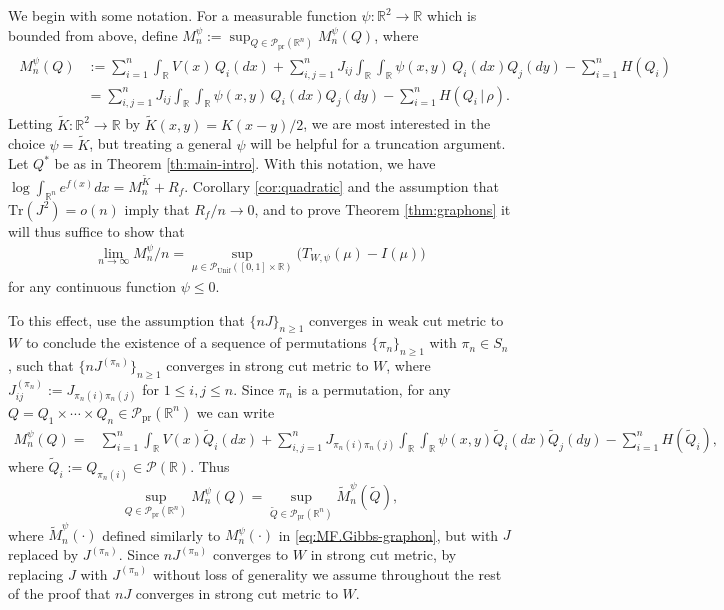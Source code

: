 \documentclass[11pt,reqno]{amsart}
\numberwithin{equation}{section}
\theoremstyle{definition}
\def\R{{\mathbb R}}
\def\P{{\mathcal P}}
\def\tr{{\mathrm{Tr}}}
\def\Pprod{\P_{\mathrm{pr}}}
\def\Punif{\P_{\mathrm{Unif}}([0,1] \times \R)}
\begin{document}
We begin with some notation. For a measurable function $\psi : \R^2 \to \R$ which is bounded from above, define $M_n^\psi := \sup_{Q \in \Pprod(\R^n)}M_n^\psi(Q)$, where
\begin{align}  \begin{split}
		M_n^\psi(Q) &:= \sum_{i=1}^n \int_{\R} V(x) \, Q_i(dx)  +  \sum_{i,j=1}^n J_{ij} \int_{\R} \int_{\R} \psi(x,y)\,Q_i(dx)Q_j(dy)  -  \sum_{i=1}^n H(Q_i) \\
		&=  \sum_{i,j=1}^n J_{ij} \int_{\R} \int_{\R} \psi(x,y)\,Q_i(dx)Q_j(dy)  -  \sum_{i=1}^n H(Q_i\,|\,\rho).
	\end{split} \label{eq:MF.Gibbs-graphon}
\end{align}
Letting $\widetilde{K} : \R^2\to\R$ by $\widetilde{K}(x,y)=K(x-y)/2$, we are most interested in the choice $\psi=\widetilde{K}$, but treating a general $\psi$ will be helpful for a truncation argument.
Let $Q^*$ be as in Theorem \ref{th:main-intro}. 
With this notation, we have $\log \int_{\R^n} e^{f(x)}dx = M_n^{\widetilde{K}} + R_f$.
Corollary \ref{cor:quadratic} and the assumption that $\tr(J^2)=o(n)$ imply that $R_f/n \to 0$, and to prove Theorem \ref{thm:graphons} it will thus suffice to show that
\begin{align} \label{eq: MF.graphons.limit}
	\lim_{n \to \infty} M_n^{\psi}/n  =	\sup_{\mu\in \Punif} \big( T_{W,\psi}(\mu)-I(\mu)\big)
\end{align}
for any continuous function $\psi \le 0$.



	To this effect, use the assumption that $\{nJ\}_{n\ge 1}$ converges in weak cut metric to $W$ to conclude the existence of a sequence of permutations $\{\pi_n\}_{n\ge 1}$ with $\pi_n\in S_n$, such that $\{nJ^{(\pi_n)}\}_{n\ge 1}$ converges in strong cut metric to $W$, where  $J^{(\pi_n)}_{ij}:=J_{\pi_n(i)\pi_n(j)}$ for $1\le i,j\le n$. Since $\pi_n$ is a permutation, for any $Q =Q_1\times\cdots\times Q_n \in \Pprod(\R^n)$ we can write 
	\begin{align*}
		M_n^\psi(Q) 
		=&\sum_{i=1}^n \int_{\R} V(x)\tilde{Q}_{i}(dx)+\sum_{i,j=1}^nJ_{\pi_n(i)\pi_n(j)} \int_{\R}\int_{\R} \psi(x,y) \tilde{Q}_{i}(dx)\tilde{Q}_{j}(dy)-\sum_{i=1}^nH(\tilde{Q}_{i}),
	\end{align*}
	where $\tilde{Q}_i:=Q_{\pi_n(i)}\in \mathcal{P}(\R)$. Thus 
	\begin{equation*}
		\sup_{Q\in \Pprod(\R^n)}M_n^\psi(Q)=\sup_{\tilde{Q}\in \Pprod(\R^n)}\widetilde{M}_n^\psi(\tilde{Q}),
	\end{equation*}
	where $\widetilde{M}_n^\psi(\cdot)$ defined similarly to  $M_n^\psi(\cdot)$ in \eqref{eq:MF.Gibbs-graphon}, but with $J$ replaced by $J^{(\pi_n)}$. Since $nJ^{(\pi_n)}$ converges to $W$ in strong cut metric, by replacing $J$ with $J^{(\pi_n)}$ without loss of generality we assume throughout the rest of the proof that $nJ$ converges in strong cut metric to $W$.
\end{document}
